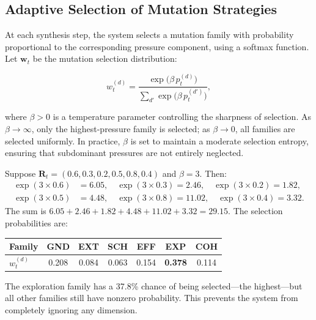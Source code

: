 \subsection{Adaptive Selection of Mutation Strategies}

At each synthesis step, the system selects a mutation family with probability proportional to the corresponding pressure component, using a softmax function. Let $\mathbf{w}_t$ be the mutation selection distribution:

\begin{equation}
w_t^{(d)} = \frac{\exp\bigl(\beta\, p_t^{(d)}\bigr)}{\sum_{d'} \exp\bigl(\beta\, p_t^{(d')}\bigr)},
\label{eq:mutation-selection}
\end{equation}

where $\beta > 0$ is a temperature parameter controlling the sharpness of selection. As $\beta \to \infty$, only the highest-pressure family is selected; as $\beta \to 0$, all families are selected uniformly. In practice, $\beta$ is set to maintain a moderate selection entropy, ensuring that subdominant pressures are not entirely neglected.

\begin{example}
\label{ex:mutation-selection}
Suppose $\mathbf{R}_t = (0.6, 0.3, 0.2, 0.5, 0.8, 0.4)$ and $\beta = 3$. Then:
\begin{align*}
\exp(3 \times 0.6) &= 6.05, \quad \exp(3 \times 0.3) = 2.46, \quad \exp(3 \times 0.2) = 1.82, \\
\exp(3 \times 0.5) &= 4.48, \quad \exp(3 \times 0.8) = 11.02, \quad \exp(3 \times 0.4) = 3.32.
\end{align*}
The sum is $6.05 + 2.46 + 1.82 + 4.48 + 11.02 + 3.32 = 29.15$. The selection probabilities are:

\medskip
\begin{center}
\begin{tabular}{lcccccc}
\toprule
Family & GND & EXT & SCH & EFF & EXP & COH \\
\midrule
$w_t^{(d)}$ & 0.208 & 0.084 & 0.063 & 0.154 & \textbf{0.378} & 0.114 \\
\bottomrule
\end{tabular}
\end{center}

\medskip
\noindent The exploration family has a 37.8\% chance of being selected---the highest---but all other families still have nonzero probability. This prevents the system from completely ignoring any dimension.
\end{example}

